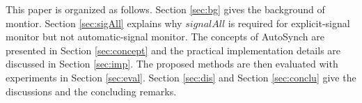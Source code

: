 \documentclass[preprint]{sigplanconf}
\begin{document}


This paper is organized as follows. Section \ref{sec:bg} gives the background
of montior. 
Section \ref{sec:sigAll} explains why $signalAll$ is required for
explicit-signal monitor but not automatic-signal monitor. The concepts of 
AutoSynch are presented in Section \ref{sec:concept} and the practical 
implementation details are discussed in Section  \ref{sec:imp}. The proposed 
methods are then evaluated with experiments in Section \ref{sec:eval}.  
Section \ref{sec:dis} and Section \ref{sec:conclu} give the discussions and the 
concluding remarks.
\end{document}
